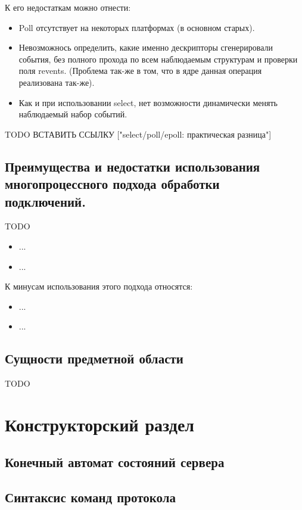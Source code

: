 \documentclass[a4paper,12pt]{report}
\begin{document}
К его недостаткам можно отнести:
\begin{itemize}
 	\item Poll отсутствует на некоторых платформах (в основном старых). 
	\item Невозможнось определить, какие именно дескрипторы сгенерировали события, без полного прохода по всем наблюдаемым структурам и проверки поля revents. (Проблема так-же в том, что в ядре данная операция реализована так-же). 
	\item Как и при использовании select, нет возможности динамически менять наблюдаемый набор событий. 
\end{itemize}

TODO ВСТАВИТЬ ССЫЛКУ ["select/poll/epoll: практическая разница"]

\section{Преимущества и недостатки использования многопроцессного подхода обработки подключений.}
TODO

\begin{itemize}
 	\item ...
	\item ...
\end{itemize}

К минусам использования этого подхода относятся:
\begin{itemize}
    \item ...
    \item ...
\end{itemize}


\section{Сущности предметной области}

TODO

\newpage
\chapter{Конструкторский раздел}

\section{Конечный автомат состояний сервера}

\section{Синтаксис команд протокола}
\end{document}
